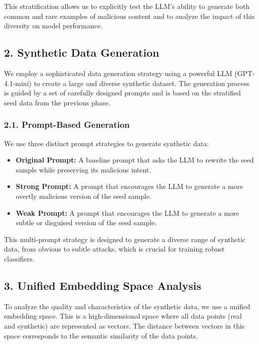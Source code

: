 \documentclass{article}
\begin{document}
This stratification allows us to explicitly test the LLM's ability to generate both common and rare examples of malicious content and to analyze the impact of this diversity on model performance.

\subsection*{2. Synthetic Data Generation}

We employ a sophisticated data generation strategy using a powerful LLM (GPT-4.1-mini) to create a large and diverse synthetic dataset. The generation process is guided by a set of carefully designed prompts and is based on the stratified seed data from the previous phase.

\subsubsection*{2.1. Prompt-Based Generation}

We use three distinct prompt strategies to generate synthetic data:

\begin{itemize}
    \item \textbf{Original Prompt:} A baseline prompt that asks the LLM to rewrite the seed sample while preserving its malicious intent.
    \item \textbf{Strong Prompt:} A prompt that encourages the LLM to generate a more overtly malicious version of the seed sample.
    \item \textbf{Weak Prompt:} A prompt that encourages the LLM to generate a more subtle or disguised version of the seed sample.
\end{itemize}

This multi-prompt strategy is designed to generate a diverse range of synthetic data, from obvious to subtle attacks, which is crucial for training robust classifiers.

\subsection*{3. Unified Embedding Space Analysis}

To analyze the quality and characteristics of the synthetic data, we use a unified embedding space. This is a high-dimensional space where all data points (real and synthetic) are represented as vectors. The distance between vectors in this space corresponds to the semantic similarity of the data points.
\end{document}
